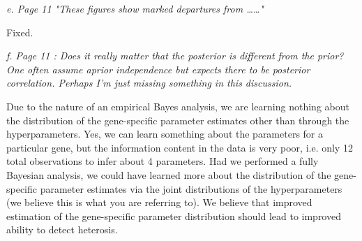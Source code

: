 \documentclass{article}
\newcommand{\comment}[1]{\textit{#1}}
\newcommand{\response}[1]{#1}
\newcommand{\todo}[1]{{\color{red} #1}}
\begin{document}
\comment{e.      Page 11 "These figures show marked departures from ……"}

\response{Fixed.}

\comment{f.      Page 11 : Does it really matter that the posterior is different from the prior?  One often assume aprior independence but expects there to be posterior correlation.  Perhaps I'm just missing something in this discussion.}

\todo{Due to the nature of an empirical Bayes analysis, we are learning nothing about the distribution of the gene-specific parameter estimates other than through the hyperparameters. Yes, we can learn something about the parameters for a particular gene, but the information content in the data is very poor, i.e. only 12 total observations to infer about 4 parameters. Had we performed a fully Bayesian analysis, we could have learned more about the distribution of the gene-specific parameter estimates via the joint distributions of the hyperparameters (we believe this is what you are referring to). We believe that improved estimation of the gene-specific parameter distribution should lead to improved ability to detect heterosis.}
\end{document}
